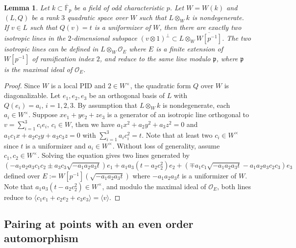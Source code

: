 \documentclass{amsart}
\numberwithin{equation}{subsection}
\numberwithin{theorem}{section}
\newtheorem{lemma}[theorem]{Lemma}
\theoremstyle{definition}
\theoremstyle{remark}
\newcommand{\bF}{\mathbb{F}}
\newcommand{\cO}{\mathcal{O}}
\newcommand{\fp}{\mathfrak{p}}
\begin{document}
\begin{lemma} \label{lem:isopair}
    Let $k\subset \overline{\bF}_p$ be a field of odd characteristic $p$. Let $W = W(k)$ and  $(L, Q)$ be a rank $3$ quadratic space over $W$ such that $L\otimes_W k$ is nondegenerate. If $v\in L$ such that $Q(v) = t$ is a uniformizer of $W$, then there are exactly two isotropic lines in the $2$-dimensional subspace $(v\otimes 1)^\perp \subset L\otimes_W \overline{W[p^{-1}]}$. The two isotropic lines can be defined in $L\otimes_W \cO_E$ where $E$ is a finite extension of $W[p^{-1}]$ of ramification index $2$, and reduce to the same line modulo $\fp$, where $\fp$ is the maximal ideal of $\cO_E$.  
\end{lemma}
\begin{proof}
    Since $W$ is a local PID and $2\in W^\times$, the quadratic form $Q$ over $W$ is diagonalizable. 
    Let $e_1, e_2, e_3$ be an orthogonal basis of $L$ with $Q(e_i) = a_i, \, i =1,2,3$. By assumption that $L\otimes_W k$ is nondegenerate, each $a_i\in W^\times$. Suppose $xe_1+ye_2+ze_3$ is a generator of an isotropic line orthogonal to $v = \sum_{i=1}^3 c_i e_i,\, c_i \in W$, then we have $a_1x^2 + a_2y^2 + a_3 z^2 = 0$ and $a_1c_1 x+ a_2 c_2 y+ a_3c_3z =0 $ with $\sum_{i=1}^3 a_ic_i^2 = t$. Note that at least two $c_i\in W^\times$ since $t$ is a uniformizer and $a_i \in W^\times$. Without loss of generality, assume $c_1, c_2\in W^\times$. Solving the equation gives two lines generated by $(-a_1a_2a_3c_1c_2\pm a_3c_3 \sqrt{-a_1a_2a_3t} )e_1 + a_1a_3(t-a_2c_2^2) e_2 + (\mp a_1c_1\sqrt{-a_1a_2a_3 t} - a_1a_2a_3 c_2 c_3) e_3$ defined over $E := W[p^{-1}](\sqrt{-a_1a_2a_3t})$ where $-a_1a_2a_3t$ is a uniformizer of $W$. Note that $a_1a_3(t-a_2c_2^2) \in W^\times$, and modulo the maximal ideal of $\cO_E$, both lines reduce to $\langle c_1e_1 + c_2e_2 + c_3 e_3\rangle = \langle v\rangle$. 
\end{proof}

\subsection{Pairing at points with an even order automorphism}
\end{document}
